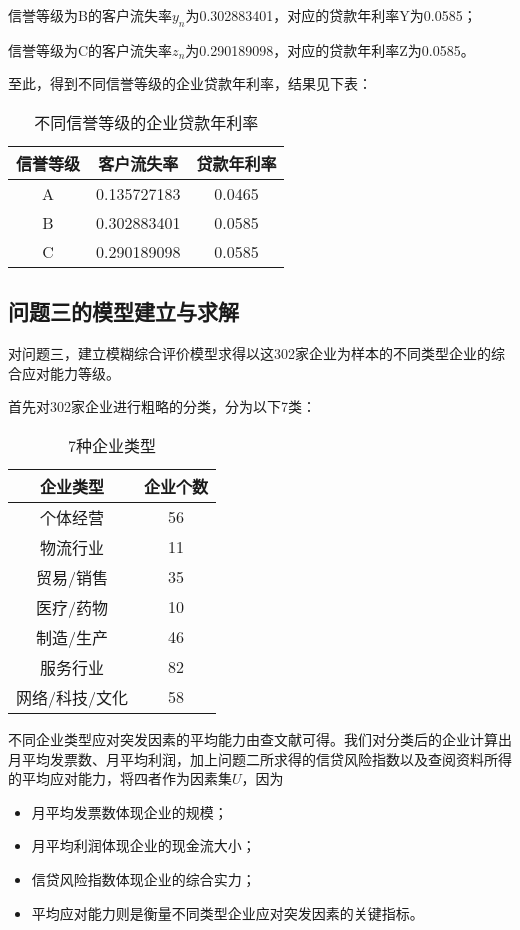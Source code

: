 \documentclass{cumcmthesis}
\begin{document}
信誉等级为B的客户流失率$y_n$为0.302883401，对应的贷款年利率Y为0.0585；

信誉等级为C的客户流失率$z_n$为0.290189098，对应的贷款年利率Z为0.0585。

至此，得到不同信誉等级的企业贷款年利率，结果见下表：
\begin{table}[H]   %
	\caption{不同信誉等级的企业贷款年利率}\label{tab:29} \centering
	\begin{tabular}{ccc}
	\toprule[1.5pt]
信誉等级 & 客户流失率       & 贷款年利率  \\
	\midrule[1pt]

A    & 0.135727183 & 0.0465 \\
B    & 0.302883401 & 0.0585 \\
C    & 0.290189098 & 0.0585 \\
\bottomrule[1.5pt]
\end{tabular}
\end{table}

\subsection{问题三的模型建立与求解}
对问题三，建立模糊综合评价模型求得以这302家企业为样本的不同类型企业的综合应对能力等级。

首先对302家企业进行粗略的分类，分为以下7类：
\begin{table}[H]   %
	\caption{7种企业类型}	\centering
	\begin{tabular}{cc}
		\toprule[1.5pt]
		企业类型 & 企业个数\\
		\midrule[1pt]
		个体经营 & 56\\
		物流行业 & 11\\
		贸易/销售 & 35\\
		医疗/药物 & 10\\
		制造/生产 & 46\\
		服务行业 & 82\\
		网络/科技/文化 & 58\\
		\bottomrule[1.5pt]
	\end{tabular}
\end{table}	
不同企业类型应对突发因素的平均能力由查文献可得。我们对分类后的企业计算出月平均发票数、月平均利润，加上问题二所求得的信贷风险指数以及查阅资料所得的平均应对能力，将四者作为因素集$U$，因为

\begin{itemize}
	\item 月平均发票数体现企业的规模；
	\item 月平均利润体现企业的现金流大小；
	\item 信贷风险指数体现企业的综合实力；
	\item 平均应对能力则是衡量不同类型企业应对突发因素的关键指标。
\end{itemize}
\end{document}
